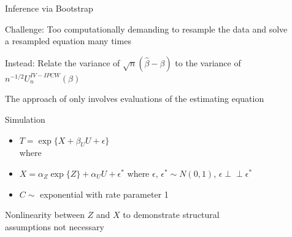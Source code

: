 \documentclass[final,plain]{beamer}
\newlength{\sepwid}
\newlength{\onecolwid}
\newlength{\halfcolwid}
\newlength{\twocolwid}
\newcommand{\bi}{\begin{itemize}}
\newcommand{\ei}{\end{itemize}}
\newcommand{\colonevsepsmall}{\vspace{8mm}}
\newcommand{\hilit}{\color{mypurple}}
\begin{document}
\begin{frame}[t]
\begin{columns}[t]
\begin{column}{\twocolwid}
\begin{columns}[t]
\begin{column}{\onecolwid}
  \end{column}


  \begin{column}{\sepwid} \end{column} %


  \begin{column}{\onecolwid}

    \begin{exampleblock}{\Large Inference via Bootstrap}

	{\hilit Challenge:} Too computationally demanding to resample the data and solve a resampled equation many times

	{\hilit Instead:} Relate the variance of $\sqrt{n}(\hat{\beta} - \beta)$ to the variance of $n^{-1/2}U_n^{IV-IPCW}(\beta) $

	The approach of \citep{zeng08} only involves evaluations of the estimating equation


    \end{exampleblock}

  \colonevsepsmall %

    \begin{block}{\Large Simulation}{
    \vspace*{0mm}

    \bi
    \item $T = \exp{\{ X + \beta_U U + \epsilon \}}$ \\
	where
    \item $X = \alpha_Z \exp{\{Z\}} + \alpha_U U + \epsilon^* $ where $\epsilon$, $\epsilon^* \sim N(0,1)$, $\epsilon \perp\!\!\!\perp \epsilon^*$
    \item $C \sim $ exponential with rate parameter 1
    \ei

    \vspace{8pt}




	\vspace{5pt}

	Nonlinearity between $Z$ and $X$ to demonstrate structural \\ assumptions not necessary
	\vspace{25pt}

}
\end{block}
\end{column}
\end{columns}
\end{column}
\end{columns}
\end{frame}
\end{document}

